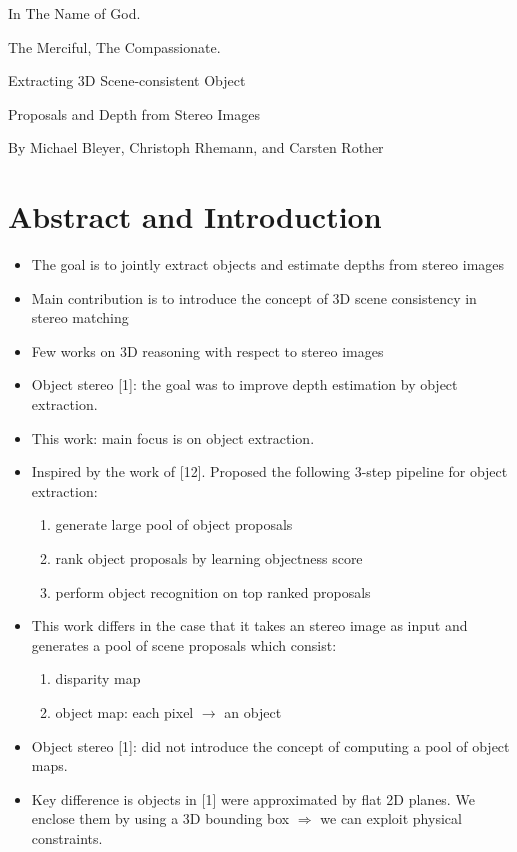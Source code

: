 \documentclass[a4paper,12pt]{article}
\begin{document}
\begin{center}
In The Name of God.

The Merciful, The Compassionate.
\vskip 1cm
{\Large\bfseries{Extracting 3D Scene-consistent Object

Proposals and Depth from Stereo Images}}

\vskip 0.2cm
\tiny{By Michael Bleyer, Christoph Rhemann, and Carsten Rother}
\end{center}

\section{Abstract and Introduction}
\begin{itemize}
\item The goal is to jointly extract objects and estimate depths from stereo images
\item Main contribution is to introduce the concept of 3D scene consistency in stereo matching
\item Few works on 3D reasoning with respect to stereo images
\item Object stereo [1]: the goal was to improve depth estimation by object extraction.
\item This work: main focus is on object extraction.
\item Inspired by the work of [12]. Proposed the following 3-step pipeline for object extraction:
\begin{enumerate}
\item generate large pool of object proposals
\item rank object proposals by learning objectness score
\item perform object recognition on top ranked proposals
\end{enumerate}
\item This work differs in the case that it takes an stereo image as input and generates a pool of scene proposals which consist:
\begin{enumerate}
\item disparity map
\item object map: each pixel $\longrightarrow$ an object
\end{enumerate}
\item Object stereo [1]: did not introduce the concept of computing a pool of object maps.
\item Key difference is objects in [1] were approximated by flat 2D planes. We enclose them by using a 3D bounding box
$\Longrightarrow$ we can exploit physical constraints.
\end{itemize}
\end{document}
